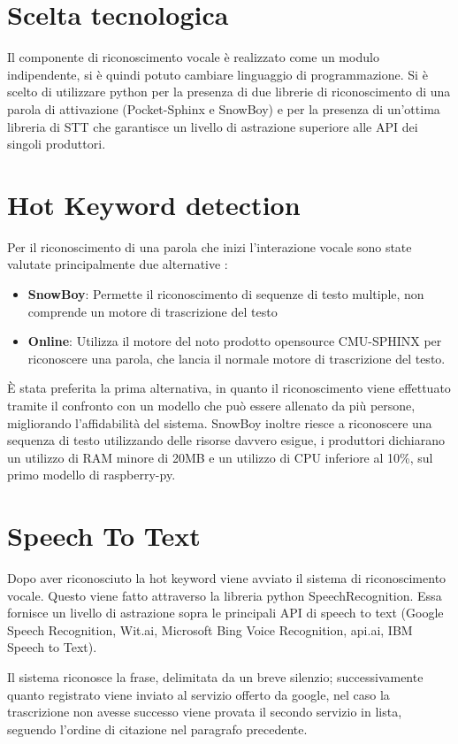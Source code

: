 \documentclass[twoside]{supsistudent}
\begin{document}
\section{Scelta tecnologica}
Il componente di riconoscimento vocale è realizzato come un modulo indipendente, si è quindi potuto cambiare linguaggio di programmazione.
Si è scelto di utilizzare python per la presenza di due librerie di riconoscimento di una parola di attivazione (Pocket-Sphinx e SnowBoy) e per la presenza di un'ottima libreria di STT che garantisce un livello di astrazione superiore alle API dei singoli produttori.

\section{Hot Keyword detection}

Per il riconoscimento di una parola che inizi l'interazione vocale sono state valutate principalmente due alternative :
\begin{itemize}
	\item \textbf{SnowBoy}: Permette il riconoscimento di sequenze di testo multiple, non comprende un motore di trascrizione del testo \cite{snowboy}
	\item \textbf{Online}: Utilizza il motore del noto prodotto opensource CMU-SPHINX per riconoscere una parola, che lancia il normale motore di trascrizione del testo.\cite{cmusphinx}
\end{itemize}
È stata preferita la prima alternativa, in quanto il riconoscimento viene effettuato tramite il confronto con un modello che può essere allenato da più persone, migliorando l'affidabilità del sistema. SnowBoy inoltre riesce a riconoscere una sequenza di testo utilizzando delle risorse davvero esigue, i produttori dichiarano un utilizzo di RAM minore di 20MB e un utilizzo di CPU inferiore al 10\%,  sul primo modello di raspberry-py. \cite{snowboy-cpu-usage}
\section{Speech To Text}
Dopo aver riconosciuto la hot keyword viene avviato il sistema di riconoscimento vocale. Questo viene fatto attraverso la libreria python SpeechRecognition. Essa fornisce un livello di astrazione sopra le principali API di speech to text (Google Speech Recognition, Wit.ai, Microsoft Bing Voice Recognition, api.ai, IBM Speech to Text).\cite{python-Speech-Recognizer}

Il sistema riconosce la frase, delimitata da un breve silenzio; successivamente quanto registrato viene inviato al servizio offerto da google, nel caso la trascrizione non avesse successo viene provata il secondo servizio in lista, seguendo l'ordine di citazione nel paragrafo precedente.  
\end{document}
